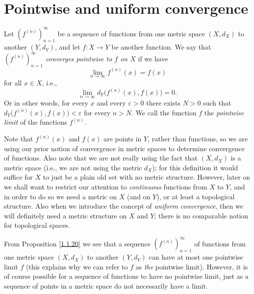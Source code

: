 \section{Pointwise and uniform convergence}\label{sec 3.2}

\begin{definition}\label{3.2.1}
    Let \((f^{(n)})_{n = 1}^\infty\) be a sequence of functions from one metric space \((X, d_X)\) to another \((Y, d_Y)\), and let \(f : X \to Y\) be another function.
    We say that \emph{\((f^{(n)})_{n = 1}^\infty\) converges pointwise to \(f\) on \(X\)} if we have
    \[
        \lim_{n \to \infty} f^{(n)}(x) = f(x)
    \]
    for all \(x \in X\), i.e.,
    \[
        \lim_{n \to \infty} d_Y\big(f^{(n)}(x), f(x)\big) = 0.
    \]
    Or in other words, for every \(x\) and every \(\varepsilon > 0\) there exists \(N > 0\) such that \(d_Y\big(f^{(n)}(x), f(x)\big) < \varepsilon\) for every \(n > N\).
    We call the function \(f\) the \emph{pointwise limit} of the functions \(f^{(n)}\).
\end{definition}

\begin{remark}\label{3.2.2}
    Note that \(f^{(n)}(x)\) and \(f(x)\) are points in \(Y\), rather than functions, so we are using our prior notion of convergence in metric spaces to determine convergence of functions.
    Also note that we are not really using the fact that \((X, d_X)\) is a metric space
    (i.e., we are not using the metric \(d_X\));
    for this definition it would suffice for \(X\) to just be a plain old set with no metric structure.
    However, later on we shall want to restrict our attention to \emph{continuous} functions from \(X\) to \(Y\), and in order to do so we need a metric on \(X\) (and on \(Y\)), or at least a topological structure.
    Also when we introduce the concept of \emph{uniform convergence}, then we will definitely need a metric structure on \(X\) and \(Y\);
    there is no comparable notion for topological spaces.
\end{remark}

\begin{note}
    From Proposition \ref{1.1.20} we see that a sequence \((f^{(n)})_{n = 1}^\infty\) of functions from one metric space \((X, d_X)\) to another \((Y, d_Y)\) can have at most one pointwise limit \(f\)
    (this explains why we can refer to \(f\) as \emph{the} pointwise limit).
    However, it is of course possible for a sequence of functions to have no pointwise limit, just as a sequence of points in a metric space do not necessarily have a limit.
\end{note}

